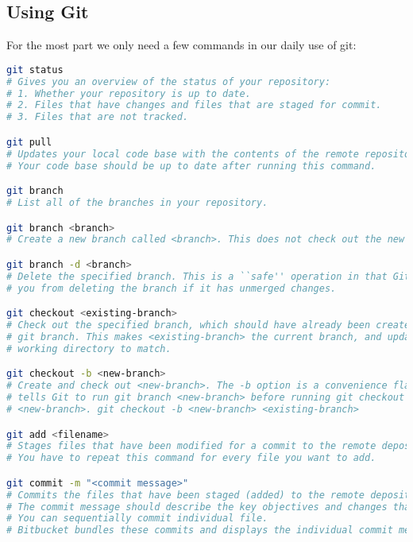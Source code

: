 


\subsection{Using Git}

For the most part we only need a few commands in our daily use of git:

\begin{lstlisting}[language=bash]
git status
# Gives you an overview of the status of your repository:
# 1. Whether your repository is up to date.
# 2. Files that have changes and files that are staged for commit.
# 3. Files that are not tracked.

git pull
# Updates your local code base with the contents of the remote repository.
# Your code base should be up to date after running this command.

git branch
# List all of the branches in your repository.

git branch <branch>
# Create a new branch called <branch>. This does not check out the new branch.

git branch -d <branch>
# Delete the specified branch. This is a ``safe'' operation in that Git prevents
# you from deleting the branch if it has unmerged changes.

git checkout <existing-branch>
# Check out the specified branch, which should have already been created with
# git branch. This makes <existing-branch> the current branch, and updates the
# working directory to match.

git checkout -b <new-branch>
# Create and check out <new-branch>. The -b option is a convenience flag that
# tells Git to run git branch <new-branch> before running git checkout
# <new-branch>. git checkout -b <new-branch> <existing-branch>

git add <filename>
# Stages files that have been modified for a commit to the remote depository.
# You have to repeat this command for every file you want to add.

git commit -m "<commit message>"
# Commits the files that have been staged (added) to the remote depository.
# The commit message should describe the key objectives and changes that were made.
# You can sequentially commit individual file. 
# Bitbucket bundles these commits and displays the individual commit messages for each part.

\end{lstlisting}

